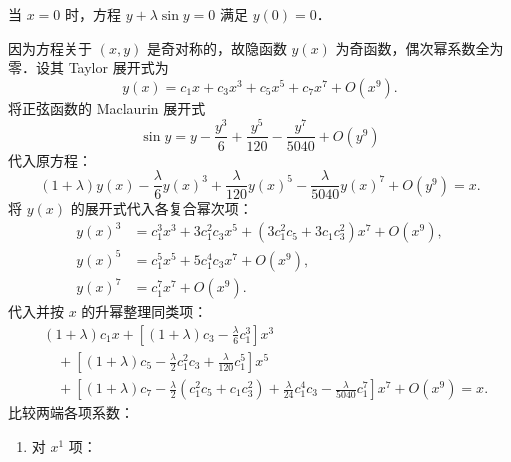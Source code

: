 \begin{solution}
    当 $x = 0$ 时，方程 $y + \lambda \sin y = 0$ 满足 $y(0) = 0$．

    因为方程关于 $(x, y)$ 是奇对称的，故隐函数 $y(x)$ 为奇函数，偶次幂系数全为零．设其 Taylor 展开式为
    \begin{equation}
        y(x) = c_1 x + c_3 x^3 + c_5 x^5 + c_7 x^7 + O(x^9).
    \end{equation}
    将正弦函数的 Maclaurin 展开式
    \begin{equation}
        \sin y = y - \frac{y^3}{6} + \frac{y^5}{120} - \frac{y^7}{5040} + O(y^9)
    \end{equation}
    代入原方程：
    \begin{equation}
        (1 + \lambda)y(x) - \frac{\lambda}{6}y(x)^3
        + \frac{\lambda}{120}y(x)^5
        - \frac{\lambda}{5040}y(x)^7 + O(y^9) = x.
    \end{equation}
    将 $y(x)$ 的展开式代入各复合幂次项：
    \begin{equation}
        \begin{aligned}
            y(x)^3 & = c_1^3x^3 + 3c_1^2c_3x^5
            + \left(3c_1^2c_5 + 3c_1c_3^2\right)x^7 + O(x^9), \\
            y(x)^5 & = c_1^5x^5 + 5c_1^4c_3x^7 + O(x^9),      \\
            y(x)^7 & = c_1^7x^7 + O(x^9).
        \end{aligned}
    \end{equation}
    代入并按 $x$ 的升幂整理同类项：
    \begin{equation}
        \begin{aligned}
             & (1 + \lambda)c_1x
            + \left[(1 + \lambda)c_3 - \frac{\lambda}{6}c_1^3\right]x^3       \\
             & \quad + \left[(1 + \lambda)c_5
                           - \frac{\lambda}{2}c_1^2c_3
                           + \frac{\lambda}{120}c_1^5\right]x^5               \\
             & \quad + \left[(1 + \lambda)c_7
                           - \frac{\lambda}{2}\left(c_1^2c_5 + c_1c_3^2\right)
                           + \frac{\lambda}{24}c_1^4c_3
                           - \frac{\lambda}{5040}c_1^7\right]x^7
            + O(x^9) = x.
        \end{aligned}
    \end{equation}
    比较两端各项系数：
    \begin{enumerate}
        \item 对 $x^1$ 项：

\end{enumerate}
\end{solution}
